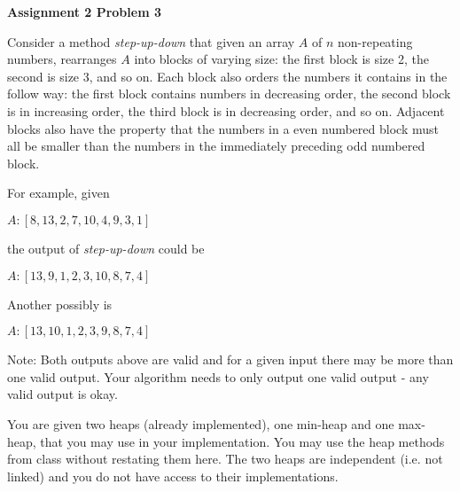 \documentclass[12pt]{article}
\begin{document}
	
	\begin{center}
		{\Large\bf Assignment 2 Problem 3}\\
		\vspace{3mm}
	\end{center}
	
	\def\question#1{\item[\bf #1.]}
	\def\part#1{\item[\bf #1)]}
	\newcommand{\pc}[1]{\mbox{\textbf{#1}}} %
	
	
	
	
	Consider a method \emph{step-up-down} that given an array $A$ of $n$ non-repeating numbers, rearranges $A$ into blocks of varying size: the first block is size 2, the second is size 3, and so on.  Each block also orders the numbers it contains in the follow way: the first block contains numbers in decreasing order, the second block is in increasing order, the third block is in decreasing order, and so on. Adjacent blocks also have the property that the numbers in a even numbered block must all be smaller than the numbers in the immediately preceding odd numbered block.
	
	For example, given
	\begin{center}
		$A: [8,13,2,7,10,4,9,3,1]$
	\end{center}
	the output of \emph{step-up-down} could be
	\begin{center}
		$A: [13, 9, 1, 2, 3, 10, 8, 7, 4]$
	\end{center}
	Another possibly is
	\begin{center}
		$A: [13, 10, 1, 2, 3, 9, 8, 7, 4]$
	\end{center}
	
	\noindent Note: Both outputs above are valid and for a given input there may be more than one valid output. 
	Your algorithm needs to only output one valid output - any valid output is okay.
	
	\bigskip
	
	\noindent You are given two heaps (already implemented), one min-heap and one max-heap, that you may use in your implementation.
	You may use the heap methods from class without restating them here.
	The two heaps are independent (i.e. not linked) and you do not have access to their implementations.
	
\end{document}
